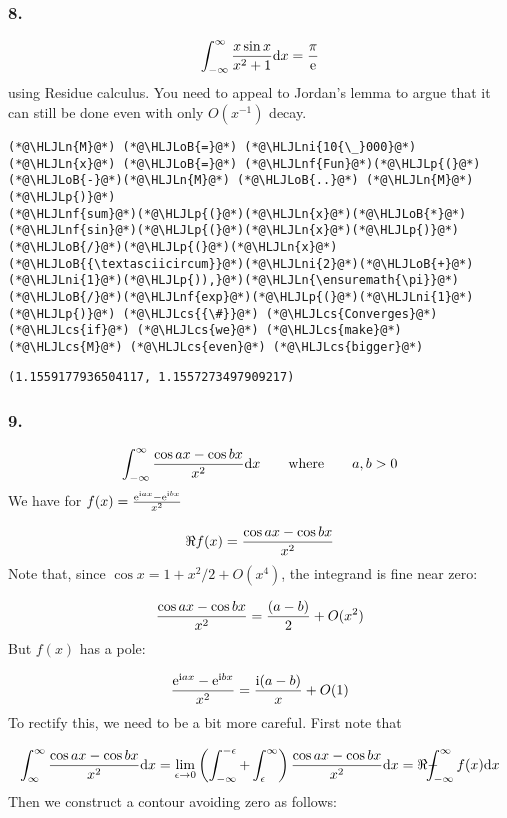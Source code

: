 \documentclass[12pt,landscape]{article}
\newcommand{\HLJLn}[1]{#1}
\newcommand{\HLJLnf}[1]{\textcolor[RGB]{66,102,213}{#1}}
\newcommand{\HLJLni}[1]{\textcolor[RGB]{59,151,46}{#1}}
\newcommand{\HLJLoB}[1]{\textcolor[RGB]{102,102,102}{\textbf{#1}}}
\newcommand{\HLJLp}[1]{#1}
\newcommand{\HLJLcs}[1]{\textcolor[RGB]{153,153,119}{\textit{#1}}}
\def\D{ {\rm d} }
\def\I{ {\rm i} }
\def\E{ {\rm e} }
\def\qqwhere{\qquad\hbox{where}\qquad}
\def\Xint#1{ \mathchoice
   {\XXint\displaystyle\textstyle{#1} }%
   {\XXint\textstyle\scriptstyle{#1} }%
   {\XXint\scriptstyle\scriptscriptstyle{#1} }%
   {\XXint\scriptscriptstyle\scriptscriptstyle{#1} }%
   \!\int}
\def\XXint#1#2#3{ {\setbox0=\hbox{$#1{#2#3}{\int}$}
     \vcenter{\hbox{$#2#3$}}\kern-.5\wd0} }
\def\dashint{\Xint-}
\def\dx{\D x}
\begin{document}
{\subsubsection{8.}
\[
	\int_{-\infty}^\infty    {x \sin x \over x^2 + 1} \dx = { \pi \over \E}
\]
using Residue calculus. You need to appeal to Jordan's lemma to argue that it can still be done even with only $O(x^{-1})$ decay.


\begin{lstlisting}
(*@\HLJLn{M}@*) (*@\HLJLoB{=}@*) (*@\HLJLni{10{\_}000}@*)
(*@\HLJLn{x}@*) (*@\HLJLoB{=}@*) (*@\HLJLnf{Fun}@*)(*@\HLJLp{(}@*)(*@\HLJLoB{-}@*)(*@\HLJLn{M}@*) (*@\HLJLoB{..}@*) (*@\HLJLn{M}@*)(*@\HLJLp{)}@*)
(*@\HLJLnf{sum}@*)(*@\HLJLp{(}@*)(*@\HLJLn{x}@*)(*@\HLJLoB{*}@*)(*@\HLJLnf{sin}@*)(*@\HLJLp{(}@*)(*@\HLJLn{x}@*)(*@\HLJLp{)}@*)(*@\HLJLoB{/}@*)(*@\HLJLp{(}@*)(*@\HLJLn{x}@*)(*@\HLJLoB{{\textasciicircum}}@*)(*@\HLJLni{2}@*)(*@\HLJLoB{+}@*)(*@\HLJLni{1}@*)(*@\HLJLp{)),}@*)(*@\HLJLn{\ensuremath{\pi}}@*)(*@\HLJLoB{/}@*)(*@\HLJLnf{exp}@*)(*@\HLJLp{(}@*)(*@\HLJLni{1}@*)(*@\HLJLp{)}@*) (*@\HLJLcs{{\#}}@*) (*@\HLJLcs{Converges}@*) (*@\HLJLcs{if}@*) (*@\HLJLcs{we}@*) (*@\HLJLcs{make}@*) (*@\HLJLcs{M}@*) (*@\HLJLcs{even}@*) (*@\HLJLcs{bigger}@*)
\end{lstlisting}

\begin{lstlisting}
(1.1559177936504117, 1.1557273497909217)
\end{lstlisting}


\subsubsection{9.}
\[
\int_{-\infty}^\infty {\cos a x - \cos b x \over x^2}  \dx \qqwhere a,b > 0
\]
We have for $f(x) = {\E^{\I a x} - \E^{\I b x} \over x^2}$

\[
\Re f(x) = {\cos a x - \cos b x \over x^2}
\]
Note that, since $\cos x = 1 + x^2/2 + O(x^4)$, the integrand is fine near zero:

\[
{\cos a x - \cos b x \over x^2} = {(a -b)  \over 2} + O(x^2)
\]
But $f(x)$ has a pole:

\[
     {\E^{\I a x} - \E^{\I b x} \over x^2}  = {\I (a-b) \over x} + O(1)
\]
To rectify this, we need to be a bit more careful. First note that

\[
\int_{\infty}^\infty {\cos a x - \cos b x \over x^2} \dx = \lim_{\epsilon \rightarrow 0} \left(\int_{-\infty}^{-\epsilon} + \int_\epsilon^\infty \right){\cos a x - \cos b x \over x^2} \dx = \Re \dashint_{-\infty}^\infty f(x) \dx
\]
Then we construct a contour avoiding zero as follows:


}
\end{document}
